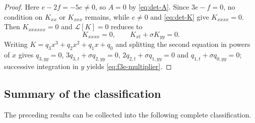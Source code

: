 \documentclass[11pt]{article}
\numberwithin{equation}{section}
\theoremstyle{definition}
\theoremstyle{remark}
\begin{document}
\begin{proof}
Here $e-2f=-5e\neq0$, so $A=0$ by \eqref{eq:det-A}. Since $3e-f=0$,
no condition on $K_{xx}$ or $K_{xxx}$ remains, while $e\neq0$ and
\eqref{eq:det-K} give $K_{xxxx}=0$. Then $K_{xxxxxx}=0$ and
$\mathcal{L}[K]=0$ reduces to
\begin{equation}
K_{xxxx}=0,
\qquad
K_{xt} + \sigma K_{yy} = 0 .
\label{eq:f3e-system}
\end{equation}
Writing $K = q_3x^3 + q_2x^2 + q_1x + q_0$ and splitting the second
equation in powers of $x$ gives $q_{3,yy}=0$,
$3q_{3,t} + \sigma q_{2,yy} = 0$, $2q_{2,t} + \sigma q_{1,yy} = 0$ and
$q_{1,t} + \sigma q_{0,yy} = 0$; successive integration in $y$ yields
\eqref{eq:f3e-multiplier}.
\end{proof}

\subsection{Summary of the classification}
\label{subsec:classification-summary}
The preceding results can be collected into the following complete
classification.
\end{document}
